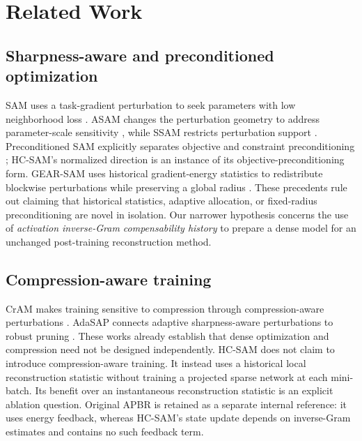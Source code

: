 \section{Related Work}
\subsection{Sharpness-aware and preconditioned optimization}
SAM uses a task-gradient perturbation to seek parameters with low neighborhood loss \cite{sam}. ASAM changes the perturbation geometry to address parameter-scale sensitivity \cite{asam}, while SSAM restricts perturbation support \cite{ssam}. Preconditioned SAM explicitly separates objective and constraint preconditioning \cite{preconditioned}; HC-SAM's normalized direction is an instance of its objective-preconditioning form. GEAR-SAM uses historical gradient-energy statistics to redistribute blockwise perturbations while preserving a global radius \cite{gear}. These precedents rule out claiming that historical statistics, adaptive allocation, or fixed-radius preconditioning are novel in isolation. Our narrower hypothesis concerns the use of \emph{activation inverse-Gram compensability history} to prepare a dense model for an unchanged post-training reconstruction method.

\subsection{Compression-aware training}
CrAM makes training sensitive to compression through compression-aware perturbations \cite{cram}. AdaSAP connects adaptive sharpness-aware perturbations to robust pruning \cite{adasap}. These works already establish that dense optimization and compression need not be designed independently. HC-SAM does not claim to introduce compression-aware training. It instead uses a historical local reconstruction statistic without training a projected sparse network at each mini-batch. Its benefit over an instantaneous reconstruction statistic is an explicit ablation question. Original APBR is retained as a separate internal reference: it uses energy feedback, whereas HC-SAM's state update depends on inverse-Gram estimates and contains no such feedback term.

